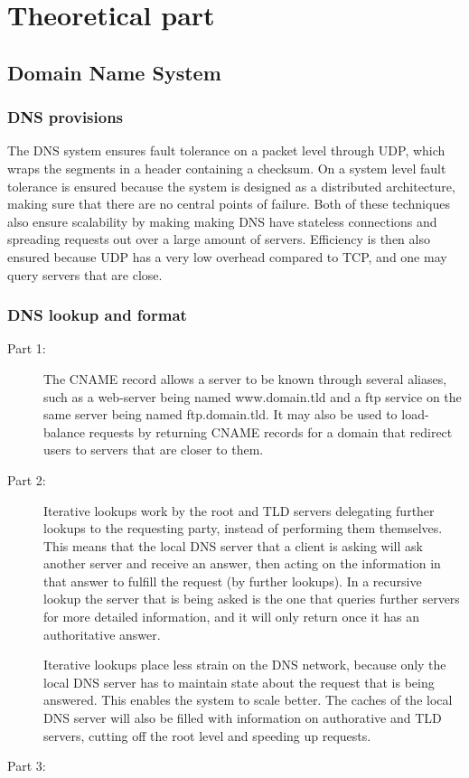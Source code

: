 \section{Theoretical part}

\subsection{Domain Name System}
\subsubsection{DNS provisions}
The DNS system ensures fault tolerance on a packet level through UDP, which wraps the segments
in a header containing a checksum. On a system level fault tolerance is ensured because the system
is designed as a distributed architecture, making sure that there are no central points of failure.
Both of these techniques also ensure scalability by making making DNS have stateless connections and
spreading requests out over a large amount of servers. Efficiency is then also ensured because UDP has
a very low overhead compared to TCP, and one may query servers that are close.

\subsubsection{DNS lookup and format}
\begin{description}
    \item[Part 1:] The CNAME record allows a server to be known through several aliases, such as
        a web-server being named www.domain.tld and a ftp service on the same server being named
        ftp.domain.tld. It may also be used to load-balance requests by returning CNAME records
        for a domain that redirect users to servers that are closer to them.
    \item[Part 2:] Iterative lookups work by the root and TLD servers delegating further lookups
        to the requesting party, instead of performing them themselves. This means that the local
        DNS server that a client is asking will ask another server and receive an answer, then acting
        on the information in that answer to fulfill the request (by further lookups). In a recursive
        lookup the server that is being asked is the one that queries further servers for more detailed
        information, and it will only return once it has an authoritative answer.

        Iterative lookups place less strain on the DNS network, because only the local DNS server has
        to maintain state about the request that is being answered. This enables the system to scale
        better. The caches of the local DNS server will also be filled with information on authorative
        and TLD servers, cutting off the root level and speeding up requests.
    \item[Part 3:]  
\end{description}

